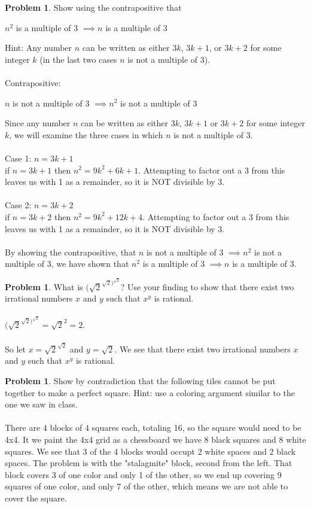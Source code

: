 \documentclass[10pt,leqno ]{article}
\theoremstyle{definition}
\newtheorem{problem}[theorem]{Problem}
\begin{document}
\begin{problem} Show using the contrapositive that
\begin{center}
$n^2$ is a multiple of 3 $\implies n$ is a multiple of 3
\end{center}
Hint:  Any number $n$ can be written as either $3k$,  $3k+ 1$,  or $3k+ 2$ for some integer $k$ (in the last two cases $n$ is not a multiple of 3).
\\\\
\Large
Contrapositive:
\begin{center}
$n$ is not a multiple of 3 $\implies n^2$ is not a multiple of 3
\end{center}
Since any number $n$ can be written as either $3k$, $3k+1$ or $3k+2$ for some integer $k$, we will examine the three cases in which $n$ is not a multiple of 3.
\\\\
Case 1: $n = 3k+1$\\
if $n = 3k+1$ then $n^2 = 9k^2 + 6k + 1$.  Attempting to factor out a 3 from this leaves us with 1 as a remainder, so it is NOT divisible by 3.
\\\\
Case 2: $n = 3k+2$\\
if $n = 3k+2$ then $n^2 = 9k^2 + 12k + 4$.  Attempting to factor out a 3 from this leaves us with 1 as a remainder, so it is NOT divisible by 3.
\\\\
By showing the contrapositive, that $n$ is not a multiple of 3 $\implies n^2$ is not a multiple of 3, we have shown that $n^2$ is a multiple of 3 $\implies n$ is a multiple of 3.
\end{problem}
\newpage


\begin{problem} What is $(\sqrt{2}^{\sqrt{2})^{\sqrt{2}}}$?  Use your finding to show that there exist two irrational numbers $x$ and $y$ such that $x^y$ is rational.
\\\\
\Large
$(\sqrt{2}^{\sqrt{2})^{\sqrt{2}}} = \sqrt{2}^2 = 2$.
\\\\
So let $x = \sqrt{2}^{\sqrt{2}}$ and $y = \sqrt{2}$.  
We see that there exist two irrational numbers $x$ and $y$ such that $x^y$ is rational.
\end{problem}
\newpage


\begin{problem} Show  by  contradiction  that  the  following  tiles  cannot  be  put  together  to make a perfect square.  Hint:  use a coloring argument similar to the one we saw in class.
\\\\
\Large
There are 4 blocks of 4 squares each, totaling 16, so the square would need to be 4x4.  It we paint the 4x4 grid as a chessboard we have 8 black squares and 8 white squares.  We see that 3 of the 4 blocks would occupt 2 white spaces and 2 black spaces.  The problem is with the "stalagmite" block, second from the left.  That block covers 3 of one color and only 1 of the other, so we end up covering 9 squares of one color, and only 7 of the other, which means we are not able to cover the square.
\end{problem}
\newpage
\end{document}
